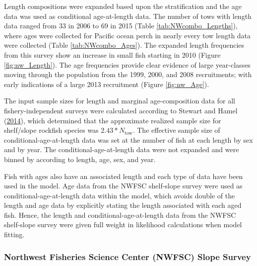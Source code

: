 \documentclass[12pt,]{article}
\begin{document}
Length compositions were expanded based upon the stratification and the
age data was used as conditional age-at-length data. The number of tows
with length data ranged from 33 in 2006 to 69 in 2015 (Table
\ref{tab:NWcombo_Lengths}), where ages were collected for Pacific ocean
perch in nearly every tow length data were collected (Table
\ref{tab:NWcombo_Ages}). The expanded length frequencies from this
survey show an increase in small fish starting in 2010 (Figure
\ref{fig:nw_Length}). The age frequencies provide clear evidence of
large year-classes moving through the population from the 1999, 2000,
and 2008 recruitments; with early indications of a large 2013
recruitment (Figure \ref{fig:nw_Age}).

The input sample sizes for length and marginal age-composition data for
all fishery-independent surveys were calculated according to Stewart and
Hamel (\protect\hyperlink{ref-stewart_bootstrapping_2014}{2014}), which
determined that the approximate realized sample size for shelf/slope
rockfish species was \(2.43*N_{\text{tow}}\). The effective sample size
of conditional-age-at-length data was set at the number of fish at each
length by sex and by year. The conditional-age-at-length data were not
expanded and were binned by according to length, age, sex, and year.

Fish with ages also have an associated length and each type of data have
been used in the model. Age data from the NWFSC shelf-slope survey were
used as conditional-age-at-length data within the model, which avoids
double of the length and age data by explicitly stating the length
associated with each aged fish. Hence, the length and
conditional-age-at-length data from the NWFSC shelf-slope survey were
given full weight in likelihood calculations when model fitting.

\subsubsection{Northwest Fisheries Science Center (NWFSC) Slope
Survey}\label{northwest-fisheries-science-center-nwfsc-slope-survey}
\end{document}
